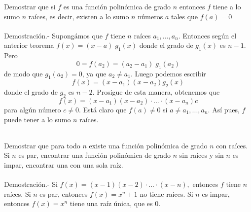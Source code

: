 \begin{teo}
Demostrar que si $f$ es una función polinómica de grado $n$ entonces $f$ tiene a lo sumo $n$ raíces, es decir, existen a lo sumo $n$ números $a$ tales que $f(a)=0$\\\\
Demostración.- \; Supongámos que $f$ tiene $n$ raíces $a_1,...,a_n$. Entonces según el anterior teorema $f(x) = (x-a)\; g_1(x)$ donde el grado de $g_1(x)$ es $n-1.$ Pero $$0=f(a_2) = (a_2 - a_1) \; g_1(a_2)$$
de modo que $g_1(a_2) = 0$, ya que $a_2 \neq a_1.$ Luego podemos escribir $$f(x)=(x-a_1)(x-a_2)g_2(x)$$ donde el grado de $g_2$ es $n-2.$ Prosigue de esta manera, obtenemos que $$f(x)=(x-a_1)(x-a_2) \cdot ... \cdot (x-a_n)c$$ para algún número $c\neq 0.$ Está claro que $f(a) \neq 0$ si $a\neq a_1,..., a_n.$ Así pues, $f$ puede tener a lo sumo $n$ raíces.\\\\
\end{teo}

\begin{teo}
Demostrar que para todo $n$ existe una función polinómica de grado $n$ con raíces. Si $n$ es par, encontrar una función polinómica de grado $n$ sin raíces y sin $n$ es impar, encontrar una con una sola raíz.\\\\
Demostración.- \; Si $f(x) = (x-1)(x-2) \cdot ... \cdot (x-n),$ entonces $f$ tiene $n$ raíces. Si $n$ es par, entonces $f(x) = x^n + 1$ no tiene raíces. Si $n$ es impar, entonces $f(x)=x^n$ tiene una raíz única, que es $0.$\\\\ 
\end{teo}

